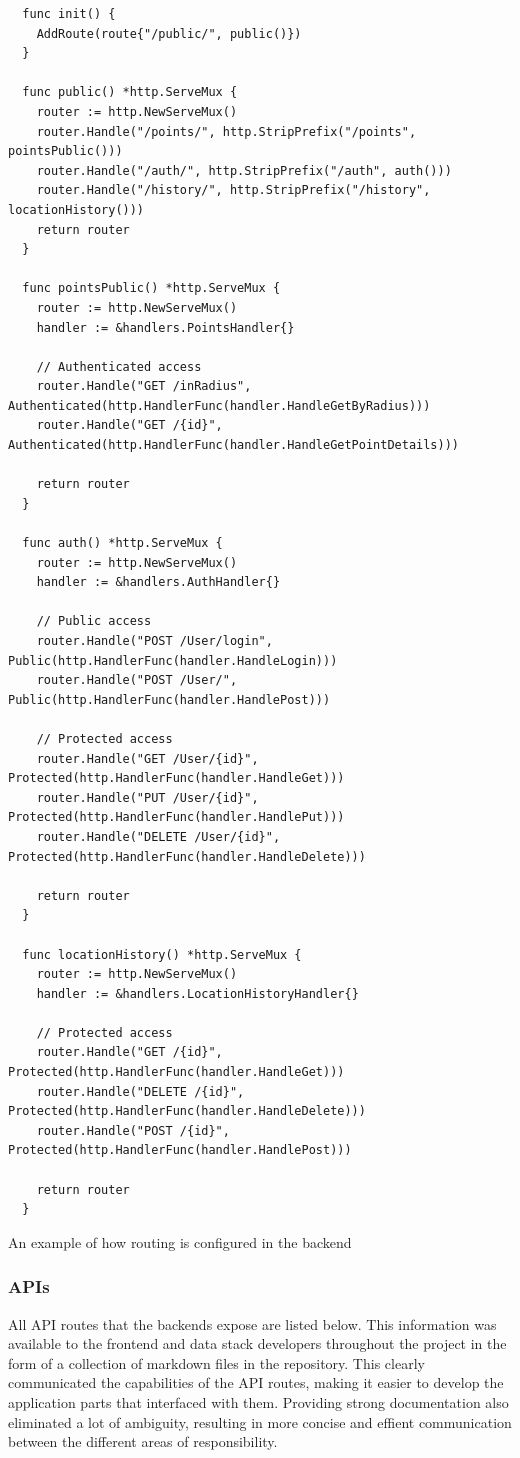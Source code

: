 \begin{listing}[htbp]
  \begin{verbatim}
  func init() {
    AddRoute(route{"/public/", public()})
  }

  func public() *http.ServeMux {
    router := http.NewServeMux()
    router.Handle("/points/", http.StripPrefix("/points", pointsPublic()))
    router.Handle("/auth/", http.StripPrefix("/auth", auth()))
    router.Handle("/history/", http.StripPrefix("/history", locationHistory()))
    return router
  }

  func pointsPublic() *http.ServeMux {
    router := http.NewServeMux()
    handler := &handlers.PointsHandler{}

    // Authenticated access
    router.Handle("GET /inRadius", Authenticated(http.HandlerFunc(handler.HandleGetByRadius)))
    router.Handle("GET /{id}", Authenticated(http.HandlerFunc(handler.HandleGetPointDetails)))

    return router
  }

  func auth() *http.ServeMux {
    router := http.NewServeMux()
    handler := &handlers.AuthHandler{}

    // Public access
    router.Handle("POST /User/login", Public(http.HandlerFunc(handler.HandleLogin)))
    router.Handle("POST /User/", Public(http.HandlerFunc(handler.HandlePost)))

    // Protected access
    router.Handle("GET /User/{id}", Protected(http.HandlerFunc(handler.HandleGet)))
    router.Handle("PUT /User/{id}", Protected(http.HandlerFunc(handler.HandlePut)))
    router.Handle("DELETE /User/{id}", Protected(http.HandlerFunc(handler.HandleDelete)))

    return router
  }

  func locationHistory() *http.ServeMux {
    router := http.NewServeMux()
    handler := &handlers.LocationHistoryHandler{}

    // Protected access
    router.Handle("GET /{id}", Protected(http.HandlerFunc(handler.HandleGet)))
    router.Handle("DELETE /{id}", Protected(http.HandlerFunc(handler.HandleDelete)))
    router.Handle("POST /{id}", Protected(http.HandlerFunc(handler.HandlePost)))

    return router
  }

  \end{verbatim}
  \caption{An example of how routing is configured in the backend}
  \label{listing:routing_example}
\end{listing}

\subsubsection{APIs}
All API routes that the backends expose are listed below. This information was
available to the frontend and data stack developers throughout the project in
the form of a collection of markdown files in the repository. This clearly
communicated the capabilities of the API routes, making it easier to develop the
application parts that interfaced with them. Providing strong documentation also
eliminated a lot of ambiguity, resulting in more concise and effient
communication between the different areas of responsibility.

